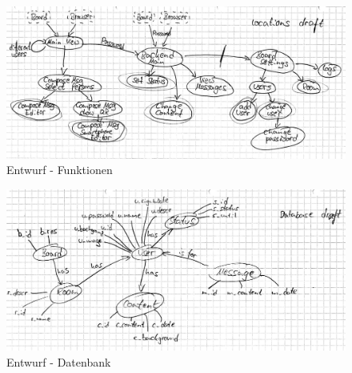 \begin{figure}[h!]
  \centering
    \includegraphics[width=1\textwidth]{./img/draftLocations.png}
  \caption{Entwurf - Funktionen}
  \label{img:anhangFunktionen}
\end{figure}
\newpage
\begin{figure}[h!]
  \centering
    \includegraphics[width=1\textwidth]{./img/draftDatabase.png}
  \caption{Entwurf - Datenbank}
  \label{img:anhangDatenbank}
\end{figure}
\newpage
\begin{figure}[h!]
  \centering
    
  \label{img:handbuch1}
\end{figure}
\label{benutzerhandbuch}
\newpage
\begin{figure}[h!]
  \centering
    
  \label{img:handbuch2}
\end{figure}
\newpage
\begin{figure}[h!]
  \centering
    
  \label{img:handbuch3}
\end{figure}
